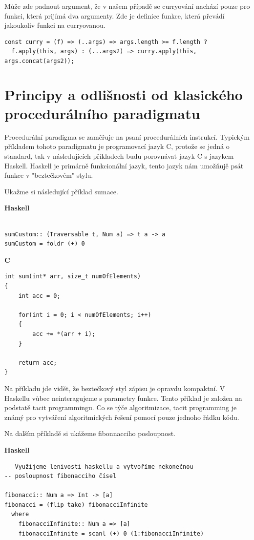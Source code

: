 \documentclass[male,czech]{kithesis}
\begin{document}
Může zde padnout argument, že v našem případě se curryování nachází pouze pro funkci,
která prijímá dva argumenty. Zde je definice funkce, která převádí jakoukoliv funkci na curryovanou.

\begin{verbatim}
const curry = (f) => (..args) => args.length >= f.length ? 
  f.apply(this, args) : (...args2) => curry.apply(this, args.concat(args2));
\end{verbatim}

\section{Principy a odlišnosti od klasického procedurálního paradigmatu}

Procedurální paradigma se zaměřuje na psaní procedurálních instrukcí.
Typickým příkladem tohoto paradigmatu je programovací jazyk C, protože se
jedná o standard, tak v následujících příkladech budu porovnávat jazyk C s jazykem Haskell.
Haskell je primárně funkcionální jazyk, tento jazyk nám umožňujě psát funkce
v "beztečkovém" stylu. 

Ukažme si následující příklad sumace.

\textbf{Haskell}
\begin{verbatim}

sumCustom:: (Traversable t, Num a) => t a -> a
sumCustom = foldr (+) 0

\end{verbatim}

\pagebreak

\textbf{C}
\begin{verbatim}
int sum(int* arr, size_t numOfElements)
{
    int acc = 0;
    
    for(int i = 0; i < numOfElements; i++)
    {
        acc += *(arr + i);
    }
    
    return acc;
}
\end{verbatim}

Na příkladu jde vidět, že beztečkový styl zápisu je opravdu kompaktní. 
V Haskellu vůbec neinteragujeme s parametry funkce.
Tento příklad je založen na podstatě tacit programmingu.
Co se týče algoritmizace, tacit programming je známý pro vytváření 
algoritmických řešení pomocí pouze jednoho řádku kódu. 


Na dalším příkladě si ukážeme fibonnacciho posloupnost.

\textbf{Haskell}
\begin{verbatim}
-- Využijeme lenivosti haskellu a vytvoříme nekonečnou 
-- posloupnost fibonacciho čísel

fibonacci:: Num a => Int -> [a]
fibonacci = (flip take) fibonacciInfinite
  where
    fibonacciInfinite:: Num a => [a]
    fibonacciInfinite = scanl (+) 0 (1:fibonacciInfinite)

\end{verbatim}
\end{document}
